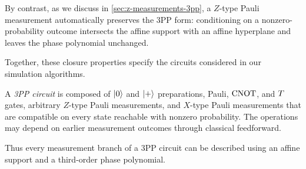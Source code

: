 By contrast, as we discuss in \cref{sec:z-measurements-3pp}, a $Z$-type Pauli measurement automatically preserves the 3PP form: conditioning on a nonzero-probability outcome intersects the affine support with an affine hyperplane and leaves the phase polynomial unchanged.

Together, these closure properties specify the circuits considered in our simulation algorithms.

\begin{definition}[3PP circuit]\label{def:3pp-circuit}
A \emph{3PP circuit} is composed of $|0\rangle$ and $|+\rangle$ preparations, Pauli, $\operatorname{CNOT}$, and $T$ gates, arbitrary $Z$-type Pauli measurements, and $X$-type Pauli measurements that are compatible on every state reachable with nonzero probability. The operations may depend on earlier measurement outcomes through classical feedforward.
\end{definition}

Thus every measurement branch of a 3PP circuit can be described using an affine support and a third-order phase polynomial.
